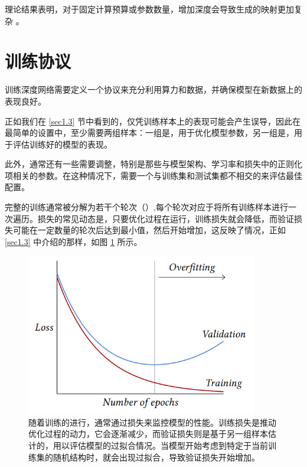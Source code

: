 理论结果表明，对于固定计算预算或参数数量，增加深度会导致生成的映射更加复杂 \citep{1602.04485}。

\section{训练协议}\label{sec3.6}

训练深度网络需要定义一个协议来充分利用算力和数据，并确保模型在新数据上的表现良好。

正如我们在 \ref{sec1.3} 节中看到的，仅凭训练样本上的表现可能会产生误导，因此在最简单的设置中，至少需要两组样本：一组是，用于优化模型参数，另一组是，用于评估训练好的模型的表现。

此外，通常还有一些需要调整，特别是那些与模型架构、学习率和损失中的正则化项相关的参数。在这种情况下，需要一个与训练集和测试集都不相交的来评估最佳配置。

完整的训练通常被分解为若干个轮次（）,每个轮次对应于将所有训练样本进行一次遍历。损失的常见动态是，只要优化过程在运行，训练损失就会降低，而验证损失可能在一定数量的轮次后达到最小值，然后开始增加，这反映了情况，正如 \ref{sec1.3} 中介绍的那样，如图 \ref{fig3.5} 所示。

\begin{figure}
    \centering
    \includegraphics[width=0.9\textwidth]{fig/fig3.5.png}
    \caption[训练损失和验证损失]{随着训练的进行，通常通过损失来监控模型的性能。训练损失是推动优化过程的动力，它会逐渐减少，而验证损失则是基于另一组样本估计的，用以评估模型的过拟合情况。当模型开始考虑到特定于当前训练集的随机结构时，就会出现过拟合，导致验证损失开始增加。}
    \label{fig3.5}
\end{figure}

